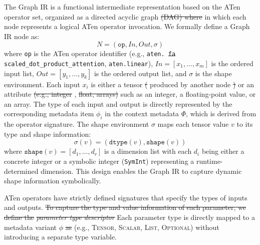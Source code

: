 \documentclass[manuscript,screen,review]{acmart}
\theoremstyle{indenteditalic}
\providecommand{\DIFaddtex}[1]{{\protect\color{blue}#1}} %
\providecommand{\DIFidentity}[1]{#1}
\providecommand{\DIFdeltex}[1]{{%
  \protect\color{red}%
  \normalfont\normalsize
  \let\textbf\DIFidentity
  \let\textit\DIFidentity
  \let\texttt\DIFidentity
  \let\textsc\DIFidentity
  \let\textsf\DIFidentity
  \let\emph\DIFidentity
  \let\uline\DIFidentity
  \sout{#1}%
}} %
\providecommand{\DIFaddbegin}{} %
\providecommand{\DIFaddend}{} %
\providecommand{\DIFdelbegin}{} %
\providecommand{\DIFdelend}{} %
\providecommand{\DIFadd}[1]{\texorpdfstring{\DIFaddtex{#1}}{#1}} %
\providecommand{\DIFdel}[1]{\texorpdfstring{\DIFdeltex{#1}}{}} %
\begin{document}
The Graph IR is a functional intermediate representation based on the ATen operator set, organized as a directed acyclic graph \DIFdelbegin \DIFdel{(DAG) where }\DIFdelend \DIFaddbegin \DIFadd{in which }\DIFaddend each node represents a logical ATen operator invocation.
We formally define a Graph IR node as:
\begin{equation}
	N = (\texttt{op}, \mathit{In}, \mathit{Out}, \sigma)
\end{equation}
where \texttt{op} is the ATen operator identifier (e.g., \texttt{aten.\DIFdelbegin \DIFdel{fa}\DIFdelend \DIFaddbegin \DIFadd{scaled\_dot\_product\_attention}\DIFaddend }\DIFaddbegin \DIFadd{, }\texttt{\DIFadd{aten.linear}}\DIFaddend ), $\mathit{In} = [x_1, \dots, x_m]$ is the ordered input list, $\mathit{Out} = [y_1, \dots, y_k]$ is the ordered output list, and $\sigma$ is the shape environment.
Each input $x_i$ is either a tensor \DIFdelbegin \DIFdel{(}\DIFdelend produced by another node \DIFdelbegin \DIFdel{) }\DIFdelend or an attribute\DIFdelbegin \DIFdel{(e.g., integer}\DIFdelend , \DIFdelbegin \DIFdel{float, arrays)}\DIFdelend \DIFaddbegin \DIFadd{such as an integer, a floating-point value, or an array.
The type of each input and output is directly represented by the corresponding metadata item $\phi_i$ in the context metadata $\Phi$, which is derived from the operator signature}\DIFaddend .
The shape environment $\sigma$ maps each tensor \DIFaddbegin \DIFadd{value }\DIFaddend $v$ to its type and shape information:
\begin{equation}
	\sigma(v) = (\texttt{dtype}(v), \texttt{shape}(v))
\end{equation}
where $\texttt{shape}(v) = [d_1, \dots, d_r]$ is a dimension list with each $d_i$ being either a concrete integer or a symbolic integer (\texttt{SymInt}) representing a runtime-determined dimension.
This design enables the Graph IR to capture dynamic shape information symbolically.

ATen operators have strictly defined signatures that specify the types of inputs and outputs.
\DIFdelbegin \DIFdel{To capture the type and value information of each parameter, we define the }\textit{\DIFdel{parameter type descriptor}} %
\DIFdelend \DIFaddbegin \DIFadd{Each parameter type is directly mapped to a metadata variant }\DIFaddend $\phi$ \DIFdelbegin \DIFdel{as }\DIFdelend \DIFaddbegin \DIFadd{(e.g., }\textsc{\DIFadd{Tensor}}\DIFadd{, }\textsc{\DIFadd{Scalar}}\DIFadd{, }\textsc{\DIFadd{List}}\DIFadd{, }\textsc{\DIFadd{Optional}}\DIFadd{) without introducing a separate type variable.
}
\end{document}
